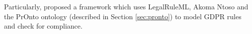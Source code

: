 Particularly, \cite{palmirani_modelling_2018} proposed a framework which uses LegalRuleML, Akoma Ntoso and the PrOnto ontology (described in Section \ref{sec:pronto}) to model GDPR rules and check for compliance.


